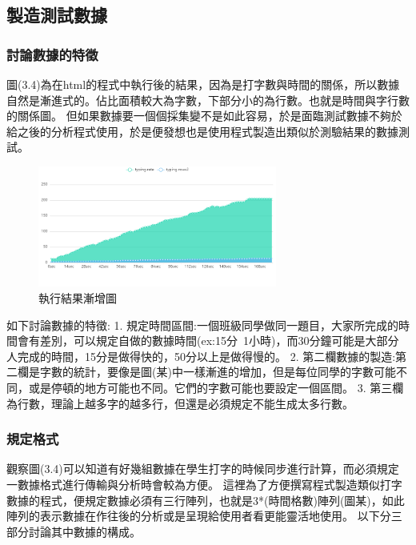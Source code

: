 \subsection{製造測試數據}
\subsubsection{討論數據的特徵}
圖(3.4)為在html的程式中執行後的結果，因為是打字數與時間的關係，所以數據自然是漸進式的。佔比面積較大為字數，下部分小的為行數。也就是時間與字行數的關係圖。
但如果數據要一個個採集變不是如此容易，於是面臨測試數據不夠於給之後的分析程式使用，於是便發想也是使用程式製造出類似於測驗結果的數據測試。
	\begin{figure}[H] %
	\centering %
	\includegraphics[width=0.7\textwidth]{3_2_1_1.png} %
	\caption{執行結果漸增圖} %
	\label{Fig.3.4} %
	\end{figure}
如下討論數據的特徵:
1. 規定時間區間:一個班級同學做同一題目，大家所完成的時間會有差別，可以規定自做的數據時間(ex:15分~1小時)，而30分鐘可能是大部分人完成的時間，15分是做得快的，50分以上是做得慢的。
2. 第二欄數據的製造:第二欄是字數的統計，要像是圖(某)中一樣漸進的增加，但是每位同學的字數可能不同，或是停頓的地方可能也不同。它們的字數可能也要設定一個區間。
3. 第三欄為行數，理論上越多字的越多行，但還是必須規定不能生成太多行數。
\subsubsection{規定格式}
觀察圖(3.4)可以知道有好幾組數據在學生打字的時候同步進行計算，而必須規定一數據格式進行傳輸與分析時會較為方便。
這裡為了方便撰寫程式製造類似打字數據的程式，便規定數據必須有三行陣列，也就是3*(時間格數)陣列(圖某)，如此陣列的表示數據在作往後的分析或是呈現給使用者看更能靈活地使用。
以下分三部分討論其中數據的構成。
